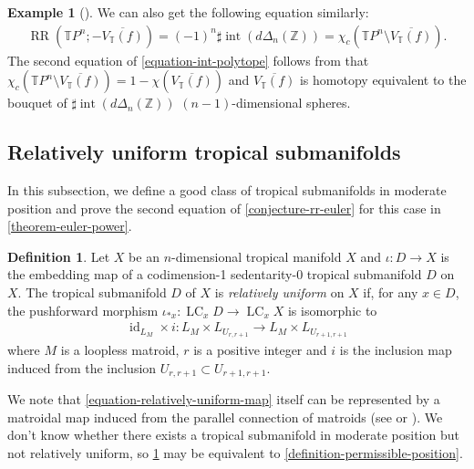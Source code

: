 \documentclass[a4paper,dvipdfmx,reqno,12pt]{amsart}
\theoremstyle{definition}
\newtheorem{definition}[theorem]{Definition}
\newtheorem{example}[theorem]{Example}
\newcommand{\opn}[1]{\operatorname{#1}}
\numberwithin{equation}{section}
\begin{document}
\begin{example}[{\cite[Example 2.11]{demedrano2023chern}}]
We can also get the following equation similarly:
\begin{align}
\label{equation-int-polytope}
\opn{RR}(\mathbb{T}P^{n};-\overline{V_{\mathbb{T}}(f)})=
(-1)^{n}\sharp \opn{int}(d\Delta_n(\mathbb{Z}))=
\chi_{c}(\mathbb{T}P^{n}\setminus
\overline{V_{\mathbb{T}}(f)}).
\end{align}
The second equation of \eqref{equation-int-polytope}
follows from that 
$\chi_{c}(\mathbb{T}P^{n}\setminus
\overline{V_{\mathbb{T}}(f)})
=1-\chi (\overline{V_{\mathbb{T}}(f)})$
and $\overline{V_{\mathbb{T}}(f)}$ is homotopy 
equivalent to the bouquet
of $\sharp \opn{int}(d\Delta_n(\mathbb{Z}))$
$(n-1)$-dimensional spheres.
\end{example}


\subsection{Relatively uniform tropical submanifolds}
In this subsection, we define a good class
of tropical submanifolds in moderate position
and prove the second equation of
\cref{conjecture-rr-euler} for this case
in \cref{theorem-euler-power}. 
\begin{definition}
\label{definition-relatively-uniform}
Let $X$ be an $n$-dimensional tropical manifold $X$
and $\iota\colon D\to X$ is the embedding map of
a codimension-1 sedentarity-0 tropical submanifold
$D$ on $X$.
The tropical submanifold $D$ of $X$
is \emph{relatively uniform} on $X$ if, for any $x\in D$, 
the pushforward morphism
$\iota_{*x}\colon\opn{LC}_{x}D\to \opn{LC}_{x}X$ is isomorphic to
\begin{align}
\label{equation-relatively-uniform-map}
\opn{id}_{L_M}\times i\colon L_{M}\times L_{U_{r,r+1}}\to 
L_{M}\times L_{U_{r+1,r+1}}
\end{align}
where
$M$ is a loopless matroid, $r$ is a positive integer
and $i$ is the inclusion map induced from the inclusion
$U_{r,r+1}\subset U_{r+1,r+1}$. 
\end{definition}




We note that \eqref{equation-relatively-uniform-map}
itself can be represented by a matroidal map
induced from the parallel connection of matroids
(see \cite[Lemma 3.1]{MR4246795}
or \cite[Proposition 3.7]{demedrano2023chern}).
We don't know whether there exists a
tropical submanifold in moderate position but
not relatively uniform, so
\cref{definition-relatively-uniform} may be equivalent
to \cref{definition-permissible-position}.
\end{document}
